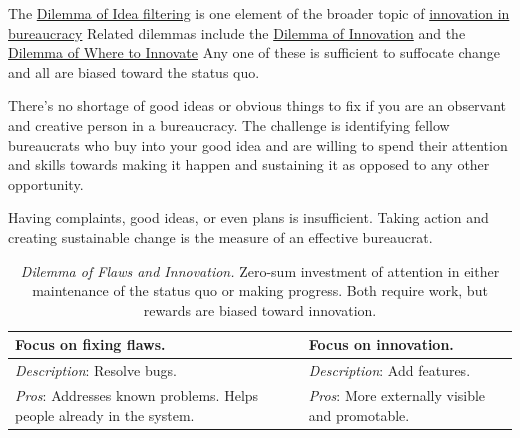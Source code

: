 The \hyperref[table:dilemma-personal-idea-filtering]{Dilemma of Idea filtering} 
\iftoggle{printedonpaper}{ (\ref{table:dilemma-personal-idea-filtering}) }{}%
is one element of the broader topic of \hyperref[sec:innovation]{innovation in bureaucracy}%
\iftoggle{printedonpaper}{ (see page~\pageref{sec:innovation}).}{.} Related dilemmas include 
the \hyperref[table:dilemma-personal-disruptive-or-iterative]{Dilemma of Innovation} 
\iftoggle{printedonpaper}{ (\ref{table:dilemma-personal-disruptive-or-iterative}) }{}%
and the \hyperref[table:dilemma-personal-where-to-innovate]{Dilemma of Where to Innovate}\iftoggle{printedonpaper}{ (\ref{table:dilemma-personal-where-to-innovate}).}{.} Any 
one of these is sufficient to suffocate change and all are biased toward the status quo.  

There's no shortage of good ideas or obvious things to fix if you are an observant and creative person in a bureaucracy.
The challenge is identifying fellow bureaucrats who buy into your good idea and are willing to spend their attention and skills towards making it happen and sustaining it as opposed to any other opportunity.

Having complaints, good ideas, or even plans is insufficient. Taking action and creating sustainable change is the measure of an effective bureaucrat.



\begin{center}
\begin{table}[H] %
\begin{tabular}{ | m{\dilemmatablewidth}| m{\dilemmatablewidth} | } 
  \hline
  \textbf{Focus on fixing flaws.} &
  \textbf{Focus on innovation.} \\
  \hline
  \textit{Description}: Resolve bugs. &
  \textit{Description}: Add features. \\
  \hline
  \textit{Pros}: Addresses known problems. Helps people already in the system.  & 
  \textit{Pros}: More externally visible and promotable. \\
  \hline
\end{tabular}
\caption{
\textit{Dilemma of Flaws and Innovation.}
Zero-sum investment of attention in either maintenance of the status quo or making progress. Both require work, but rewards are biased toward innovation. 
}
\label{table:dilemma-personal-flaws-and-innovation}
\end{table}
\end{center}

